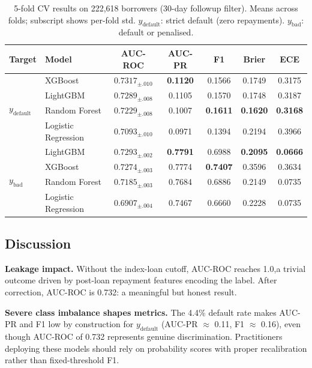 \documentclass{article}
\begin{document}
\begin{table}[tp]
\caption{5-fold CV results on 222,618 borrowers (30-day followup
  filter). Means across folds; subscript shows per-fold std.
  $y_{\text{default}}$: strict default (zero repayments).
  $y_{\text{bad}}$: default or penalised.}
\label{tab:results}
\vskip 0.1in
\begin{center}
\begin{small}
\begin{tabular}{llccccc}
\toprule
Target & Model & AUC-ROC & AUC-PR & F1 & Brier & ECE \\
\midrule
\multirow{4}{*}{$y_{\text{default}}$}
  & XGBoost             & $\mathbf{0.7317}_{\pm.010}$ & \textbf{0.1120} & 0.1566 & 0.1749 & 0.3175 \\
  & LightGBM            & $0.7289_{\pm.008}$ & 0.1105 & 0.1570 & 0.1748 & 0.3187 \\
  & Random Forest       & $0.7229_{\pm.008}$ & 0.1007 & \textbf{0.1611} & \textbf{0.1620} & \textbf{0.3168} \\
  & Logistic Regression & $0.7093_{\pm.010}$ & 0.0971 & 0.1394 & 0.2194 & 0.3966 \\
\midrule
\multirow{4}{*}{$y_{\text{bad}}$}
  & LightGBM            & $\mathbf{0.7293}_{\pm.002}$ & \textbf{0.7791} & 0.6988 & \textbf{0.2095} & \textbf{0.0666} \\
  & XGBoost             & $0.7274_{\pm.003}$ & 0.7774 & \textbf{0.7407} & 0.3596 & 0.3634 \\
  & Random Forest       & $0.7185_{\pm.003}$ & 0.7684 & 0.6886 & 0.2149 & 0.0735 \\
  & Logistic Regression & $0.6907_{\pm.004}$ & 0.7467 & 0.6660 & 0.2228 & 0.0735 \\
\bottomrule
\end{tabular}
\end{small}
\end{center}
\vskip -0.1in
\end{table}

\subsection{Discussion}

\textbf{Leakage impact.}
Without the index-loan cutoff, AUC-ROC reaches 1.0,a trivial
outcome driven by post-loan repayment features encoding the label.
After correction, AUC-ROC is 0.732: a meaningful but honest result.

\textbf{Severe class imbalance shapes metrics.}
The 4.4\% default rate makes AUC-PR and F1 low by construction for
$y_{\text{default}}$ (AUC-PR $\approx$ 0.11, F1 $\approx$ 0.16),
even though AUC-ROC of 0.732 represents genuine discrimination.
Practitioners deploying these models should rely on probability scores
with proper recalibration rather than fixed-threshold F1.
\end{document}
